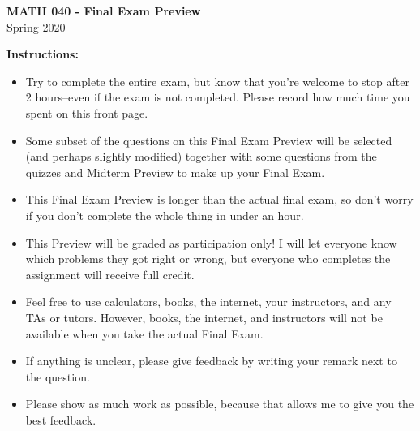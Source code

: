 \addpoints
\setlength{\parindent}{0cm}

\begin{center}

{\Large\textbf{MATH 040 - Final Exam Preview}}\\
\medskip
{\Large{Spring 2020}}

\vskip1cm
\vskip0.4cm
\vskip0.4cm

\vskip0.4cm

\end{center}
\bigskip
\textbf{Instructions:}
\begin{itemize}
  \item Try to complete the entire exam, but know that you're welcome to stop after 2 hours--even if the exam is not completed. Please record how much time
  you spent on this front page.
  \item Some subset of the questions on this Final Exam Preview will be selected (and perhaps slightly modified) together with some questions from the quizzes and Midterm Preview to make up your Final Exam.
  \item This Final Exam Preview is longer than the actual final exam, so
  don't worry if you don't complete the whole thing in under an hour.
  \item This Preview will be graded as participation only! I will let everyone
  know which problems they got right or wrong, but everyone who completes the
  assignment will receive full credit.
  \item Feel free to use calculators, books, the internet, your instructors, and
  any TAs or tutors. However, books, the internet, and instructors will not be
  available when you take the actual Final Exam.
  \item If anything is unclear, please give feedback by writing your remark next to the question.
  \item Please show as much work as possible, because that allows me to give you the best feedback.
\end{itemize}
\vskip0.4cm
\vskip0.4cm
\begin{center}
  \gradetable[h][questions]
\end{center}

\newpage
\vskip1cm
